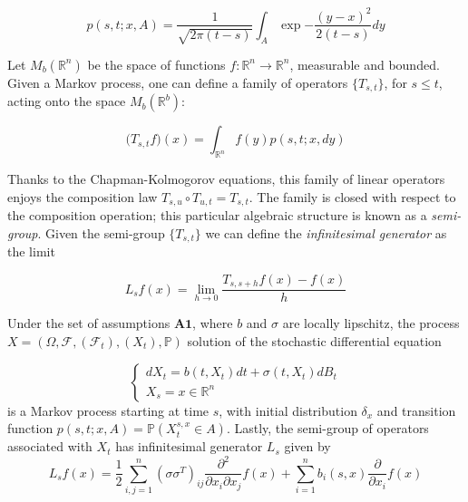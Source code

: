 \begin{equation*}
    p(s,t;x,A) = \frac{1}{\sqrt{2\pi(t-s)}} \int_A \exp{-\frac{(y-x)^2}{2(t-s)}} dy 
\end{equation*}

Let $M_b(\mathbb{R}^n)$ be the space of functions $f : \mathbb{R}^n \to \mathbb{R}^n$, measurable and bounded. Given a Markov process, one can define a family of operators $\{ T_{s,t} \}$, for $s \leq t$, acting onto the space $M_b(\mathbb{R}^b)$:

\begin{equation*}
    \big(T_{s,t}f\big)(x) = \int_{\mathbb{R}^n} f(y) p(s,t;x,dy)
\end{equation*}

Thanks to the Chapman-Kolmogorov equations, this family of linear operators enjoys the composition law $T_{s,u} \circ T_{u,t} = T_{s,t}$. The family is closed with respect to the composition operation; this particular algebraic structure is known as a \textit{semi-group}. Given the semi-group $\{ T_{s,t} \}$ we can define the \textit{infinitesimal generator} as the limit

\begin{equation}
    L_s f(x) = \lim_{h \to 0} \frac{T_{s,s+h}f(x)-f(x)}{h}
\end{equation}

\begin{theorem}
    Under the set of assumptions $\textbf{A1}$, where $b$ and $\sigma$ are locally lipschitz, the process $X = (\Omega, \mathcal{F}, (\mathcal{F}_t), (X_t), \mathbb{P})$ solution of the stochastic differential equation

    \begin{equation*}
        \begin{cases}
            dX_t = b(t,X_t)dt+\sigma(t,X_t)dB_t \\
            X_s = x \in \mathbb{R}^n
        \end{cases}
    \end{equation*}
    is a Markov process starting at time $s$, with initial distribution $\delta_x$ and transition function $p(s,t;x,A) = \mathbb{P}(X_t^{s,x} \in A)$. Lastly, the semi-group of operators associated with $X_t$ has infinitesimal generator $L_s$ given by
    \begin{equation}
        L_sf(x) = \frac{1}{2} \sum_{i,j=1}^n (\sigma \sigma^T)_{ij} \frac{\partial^2}{\partial x_i\partial x_j} f(x) + \sum_{i=1}^n b_i(s,x) \frac{\partial}{\partial x_i}f(x)
    \end{equation}
\end{theorem}

